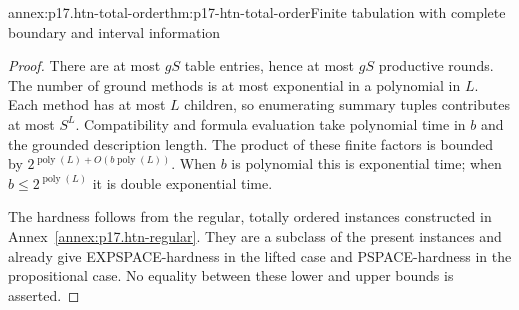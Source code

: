 \begin{annexitem}{annex:p17.htn-total-order}{thm:p17-htn-total-order}{Finite tabulation with complete boundary and interval information}
\begin{proof}
There are at most \(gS\) table entries, hence at most \(gS\) productive
rounds. The number of ground methods is at most exponential in a polynomial
in \(L\). Each method has at most \(L\) children, so enumerating summary
tuples contributes at most \(S^L\). Compatibility and formula evaluation
take polynomial time in \(b\) and the grounded description length. The
product of these finite factors is bounded by
\(2^{\operatorname{poly}(L)+O(b\operatorname{poly}(L))}\).
When \(b\) is polynomial this is exponential time; when
\(b\leq2^{\operatorname{poly}(L)}\) it is double exponential time.

The hardness follows from the regular, totally ordered instances constructed
in Annex~\ref{annex:p17.htn-regular}. They are a subclass of the present
instances and already give EXPSPACE-hardness in the lifted case and
PSPACE-hardness in the propositional case. No equality between these lower
and upper bounds is asserted.
\end{proof}
\end{annexitem}

